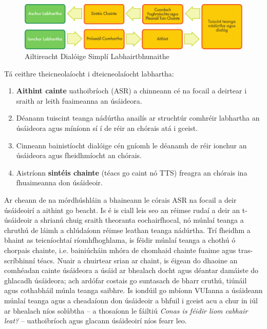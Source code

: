 \documentclass[]{../../metanetpaper}
\begin{document}
\begin{multicols}{2}

\begin{figure}[htb]
  \center 
  \includegraphics[width=\textwidth]{../_media/irish/simple_speech-based_dialogue_architecture}
  \caption{Ailtireacht Dialóige Simplí Labhairtbhunaithe}
  \label{fig:dialoguearch_de}
\end{figure}

Tá ceithre theicneolaíocht i dteicneolaíocht labhartha:

\begin{enumerate}
\item \textbf {Aithint cainte} uathoibríoch (ASR) a chinneann cé na focail a deirtear i sraith ar leith fuaimeanna an úsáideora.
\item Déanann tuiscint teanga nádúrtha anailís ar struchtúr comhréir labhartha an úsáideora agus míníonn sí í de réir an chórais atá i gceist.
\item Cinneann bainistíocht dialóige cén gníomh le déanamh de réir ionchur an úsáideora agus fheidhmíocht an chórais.    
\item Aistríonn \textbf{sintéis chainte} (téacs go caint nó TTS) freagra an chórais ina fhuaimeanna don úsáideoir.
\end{enumerate}

Ar cheann de na mórdhúshláin a bhaineann le córais ASR na focail a deir úsáideoirí a aithint go beacht. Is é is ciall leis seo an réimse rudaí a deir an t-úsáideoir a shrianú chuig sraith theoranta eochairfhocal, nó múnlaí teanga a chruthú de láimh a chlúdaíonn réimse leathan teanga nádúrtha. Trí fheidhm a bhaint as teicníochtaí ríomhfhoghlama, is féidir múnlaí teanga a chothú ó chorpais chainte, i.e. bainiúcháin mhóra de chomhaid chainte fuaime agus tras-scríbhinní téacs. Nuair a chuirtear srian ar chaint, is éigean do dhaoine an comhéadan cainte úsáideora a úsáid ar bhealach docht agus déantar damáiste do ghlacadh úsáideora; ach ardófar costais go suntasach de bharr cruthú, tiúnáil agus cothabháil múnla teanga saibhre. Is iondúil go mbíonn VUIanna a úsáideann múnlaí teanga agus a cheadaíonn don úsáideoir a bhfuil i gceist acu a chur in iúl ar bhealach níos solúbtha – a thosaíonn le fáiltiú \textit{Conas is féidir liom cabhair leat?} – uathoibríoch agus glacann úsáideoirí níos fearr leo. 


\end{multicols}
\end{document}
